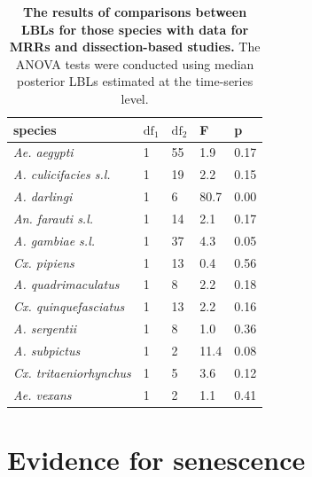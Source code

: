 \documentclass[12pt]{article}
\begin{document}
\begin{table}[htbp]
	\centering
	\begin{tabular}{l|l|l|l|l}
		species & \multicolumn{1}{l}{$\text{df}_1$} & \multicolumn{1}{l}{$\text{df}_2$} & \multicolumn{1}{l}{F} & \multicolumn{1}{l}{p} \\
		\midrule
		\textit{Ae. aegypti} & 1     & 55    & 1.9   & 0.17 \\
		\textit{A. culicifacies s.l.} & 1     & 19    & 2.2   & 0.15 \\
		\textit{A. darlingi} & 1     & 6     & 80.7   & 0.00 \\
		\textit{An. farauti s.l.} & 1     & 14    & 2.1  & 0.17 \\
		\textit{A. gambiae s.l.} & 1     & 37    & 4.3   & 0.05 \\
		\textit{Cx. pipiens} & 1     & 13    & 0.4   & 0.56 \\
		\textit{A. quadrimaculatus} & 1     & 8     & 2.2     & 0.18 \\
		\textit{Cx. quinquefasciatus} & 1     & 13    & 2.2    & 0.16 \\
		\textit{A. sergentii} & 1     & 8     & 1.0    & 0.36 \\
		\textit{A. subpictus} & 1     & 2    & 11.4   & 0.08 \\
		\textit{Cx. tritaeniorhynchus} & 1     & 5     & 3.6   & 0.12 \\
		\textit{Ae. vexans} & 1     & 2     & 1.1   & 0.41 \\
	\end{tabular}%
	\caption{\textbf{The results of comparisons between LBLs for those species with data for MRRs and dissection-based studies.} The ANOVA tests were conducted using median posterior LBLs estimated at the time-series level.}
	\label{tab:comparison}%
\end{table}%

\section{Evidence for senescence}
\end{document}
